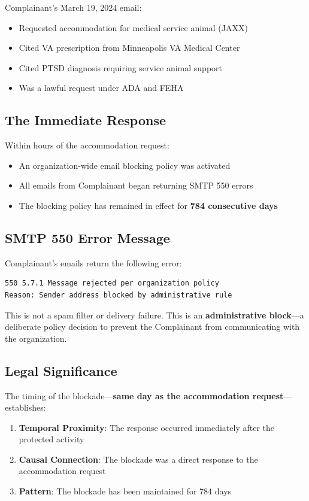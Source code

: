 \documentclass[12pt,letterpaper]{article}
\begin{document}
Complainant's March 19, 2024 email:
\begin{itemize}[noitemsep]
    \item Requested accommodation for medical service animal (JAXX)
    \item Cited VA prescription from Minneapolis VA Medical Center
    \item Cited PTSD diagnosis requiring service animal support
    \item Was a lawful request under ADA and FEHA
\end{itemize}

\subsection{The Immediate Response}

Within hours of the accommodation request:
\begin{itemize}[noitemsep]
    \item An organization-wide email blocking policy was activated
    \item All emails from Complainant began returning SMTP 550 errors
    \item The blocking policy has remained in effect for \textbf{784 consecutive days}
\end{itemize}

\subsection{SMTP 550 Error Message}

Complainant's emails return the following error:

\begin{verbatim}
550 5.7.1 Message rejected per organization policy
Reason: Sender address blocked by administrative rule
\end{verbatim}

This is not a spam filter or delivery failure. This is an \textbf{administrative block}---a deliberate policy decision to prevent the Complainant from communicating with the organization.

\subsection{Legal Significance}

The timing of the blockade---\textbf{same day as the accommodation request}---establishes:
\begin{enumerate}[noitemsep]
    \item \textbf{Temporal Proximity}: The response occurred immediately after the protected activity
    \item \textbf{Causal Connection}: The blockade was a direct response to the accommodation request
    \item \textbf{Pattern}: The blockade has been maintained for 784 days
\end{enumerate}
\end{document}
